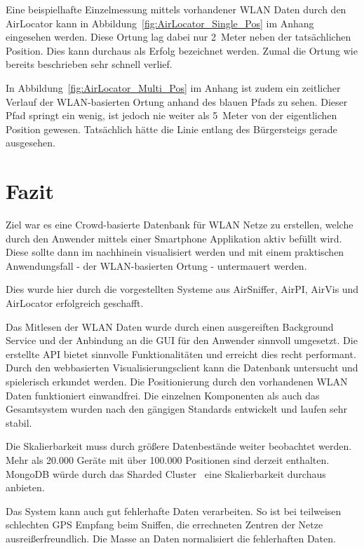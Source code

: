 \documentclass[11pt,a4paper]{article}
\begin{document}
Eine beispielhafte Einzelmessung mittels vorhandener WLAN Daten durch den AirLocator kann in Abbildung~\ref{fig:AirLocator_Single_Pos} im Anhang eingesehen werden. Diese Ortung lag dabei nur 2~Meter neben der tatsächlichen Position. Dies kann durchaus als Erfolg bezeichnet werden. Zumal die Ortung wie bereits beschrieben sehr schnell verlief.

In Abbildung~\ref{fig:AirLocator_Multi_Pos} im Anhang ist zudem ein zeitlicher Verlauf der WLAN-basierten Ortung anhand des blauen Pfads zu sehen. Dieser Pfad springt ein wenig, ist jedoch nie weiter als 5~Meter von der eigentlichen Position gewesen. Tatsächlich hätte die Linie entlang des Bürgersteigs gerade ausgesehen.

\section{Fazit}

Ziel war es eine Crowd-basierte Datenbank für WLAN Netze zu erstellen, welche durch den Anwender mittels einer Smartphone Applikation aktiv befüllt wird. Diese sollte dann im nachhinein visualisiert werden und mit einem praktischen Anwendungsfall - der WLAN-basierten Ortung - untermauert werden.

Dies wurde hier durch die vorgestellten Systeme aus AirSniffer, AirPI, AirVis und AirLocator erfolgreich geschafft. 

Das Mitlesen der WLAN Daten wurde durch einen ausgereiften Background Service und der Anbindung an die GUI für den Anwender sinnvoll umgesetzt. Die erstellte API bietet sinnvolle Funktionalitäten und erreicht dies recht performant. Durch den webbasierten Visualisierungsclient kann die Datenbank untersucht und spielerisch erkundet werden. Die Positionierung durch den vorhandenen WLAN Daten funktioniert einwandfrei. Die einzelnen Komponenten als auch das Gesamtsystem wurden nach den gängigen Standards entwickelt und laufen sehr stabil.

Die Skalierbarkeit muss durch größere Datenbestände weiter beobachtet werden.
Mehr als 20.000 Geräte mit über 100.000 Positionen sind derzeit enthalten. MongoDB würde durch das Sharded Cluster~\cite{sharding} eine Skalierbarkeit durchaus anbieten.

Das System kann auch gut fehlerhafte Daten verarbeiten. So ist bei teilweisen schlechten GPS Empfang beim Sniffen, die errechneten Zentren der Netze ausreißerfreundlich. Die Masse an Daten normalisiert die fehlerhaften Daten.
\end{document}
